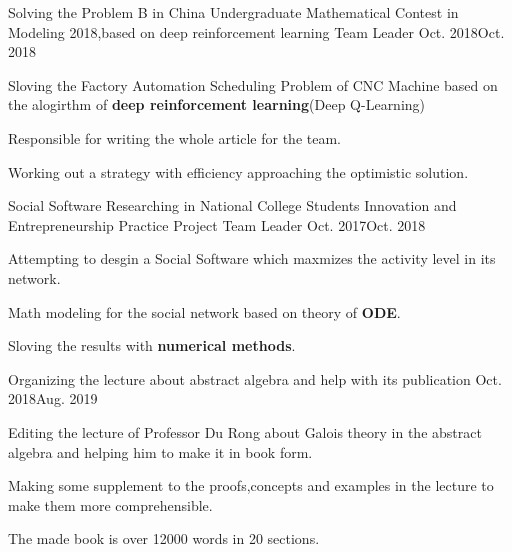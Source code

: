 
\begin{projitem}
    {Solving the Problem B in China Undergraduate Mathematical Contest in Modeling 2018,based on deep reinforcement learning}
    {Team Leader}
    {Oct. 2018}{Oct. 2018 }
    \item Sloving the Factory Automation Scheduling Problem of CNC Machine based on the alogirthm of \textbf{deep reinforcement learning}(Deep Q-Learning)
    \item Responsible for writing the whole article for the team.
    \item Working out a strategy with efficiency approaching the optimistic solution.
\end{projitem}
\begin{projitem}
    {Social Software Researching in National College Students Innovation and Entrepreneurship Practice Project}
    {Team Leader}
    {Oct. 2017}{Oct. 2018 }
    \item Attempting to desgin a Social Software which maxmizes the activity level in its network.
    \item Math modeling for the social network based on theory of \textbf{ODE}.
    \item Sloving the results with \textbf{numerical methods}.
\end{projitem}
\begin{projitem}
    {Organizing the lecture about abstract algebra and help with its publication}
    {}
    {Oct. 2018}{Aug. 2019}
    \item Editing the lecture of Professor Du Rong about Galois theory in the abstract algebra and helping him to make it in book form.
    \item Making some supplement to the proofs,concepts and examples in the lecture to make them more comprehensible.
    \item The made book is over 12000 words in 20 sections.
\end{projitem}

\endinput